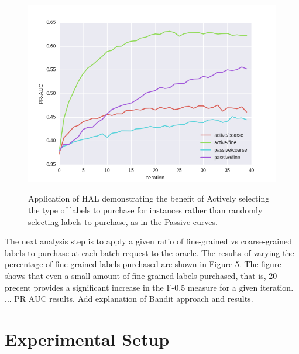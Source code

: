 \documentclass[ms]{nuthesis}
\begin{document}
\FloatBarrier
\begin{figure}[!htb]
	\centering
    \includegraphics[width=1.0\columnwidth]{fig/draft-richmond}
    \label{fig:draft-richmond}
    \caption{Application of HAL demonstrating the benefit of Actively selecting the type
    of labels to purchase for instances rather than randomly selecting labels to purchase,
    as in the Passive curves.}
\end{figure}
\FloatBarrier


\par The next analysis step is to apply a given ratio of fine-grained vs coarse-grained
labels to purchase at each batch request to the oracle. The results of varying the
percentage of fine-grained labels purchased are shown in Figure 5. The figure shows
that even a small amount of fine-grained labels purchased, that is, 20 precent provides a
significant increase in the F-0.5 measure for a given iteration. ...  PR AUC results.
Add explanation of Bandit approach and results.



\chapter{Experimental Setup}
\end{document}
